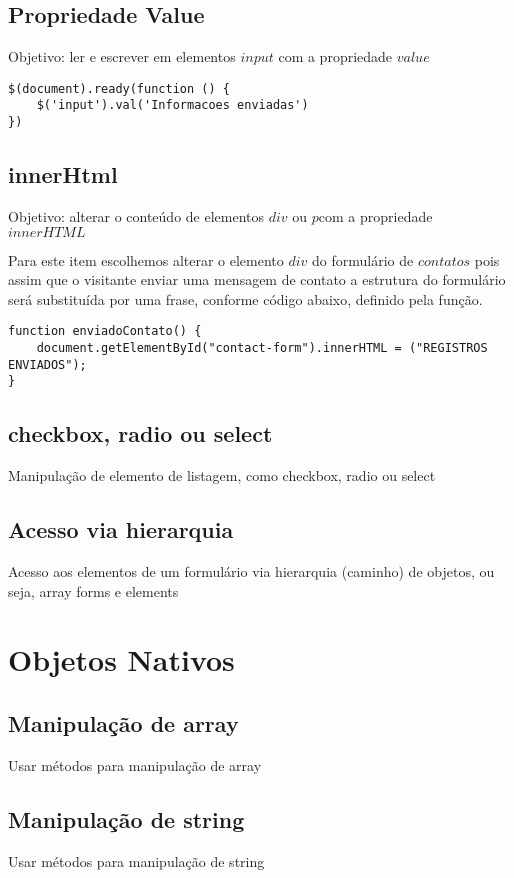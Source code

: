\subsection{Propriedade Value}
	Objetivo: ler e escrever em elementos $input$ com a propriedade $value$
	
\begin{lstlisting}
$(document).ready(function () {
    $('input').val('Informacoes enviadas')
})
\end{lstlisting}


\subsection{innerHtml}
	Objetivo: alterar o conteúdo de elementos $div$ ou $p$com a propriedade $innerHTML$
	
	Para este item escolhemos alterar o elemento $div$ do formulário de $contatos$ pois assim que o visitante enviar uma mensagem de contato a estrutura do formulário será substituída por uma frase, conforme código abaixo, definido pela função.

\begin{lstlisting}
function enviadoContato() {
    document.getElementById("contact-form").innerHTML = ("REGISTROS ENVIADOS");
}
\end{lstlisting}


\subsection{checkbox, radio ou select}
Manipulação de elemento de listagem, como checkbox, radio ou select


\subsection{Acesso via hierarquia}
Acesso aos elementos de um formulário via hierarquia (caminho) de objetos, ou seja, array forms e elements



\section{Objetos Nativos }
\subsection{Manipulação de array}
Usar métodos para manipulação de array
\subsection{Manipulação de string}
Usar métodos para manipulação de string

